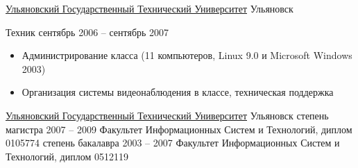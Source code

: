 \documentclass[unicode, 10pt, a4paper, oneside, fleqn]{article}
\begin{document}

\job
    {\href{http://www.ulstu.ru}{Ульяновский Государственный Технический Университет}}
    {Ульяновск}
    {
        \position
            {Техник}
            {сентябрь 2006 -- сентябрь 2007}
            {
                \begin{itemize}
                    \item{Администрирование класса (11 компьютеров,
                           Linux 9.0 и Microsoft Windows 2003)}
                    \item{Организация системы видеонаблюдения в классе,
                          техническая поддержка}
                \end{itemize}
            }
    }



\job
    {\href{http://www.ulstu.ru}{Ульяновский Государственный Технический Университет}}
    {Ульяновск}
    {
        \positionnobreak
            {степень магистра}
            {2007 -- 2009}
            {Факультет Информационных Систем и Технологий, диплом  0105774}
        \positionnobreak
            {степень бакалавра}
            {2003 -- 2007}
            {Факультет Информационных Систем и Технологий, диплом  0512119}
    }


\end{document}
